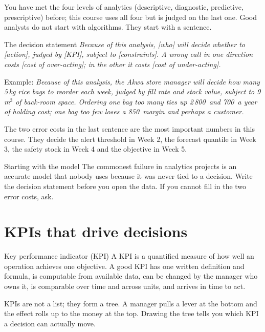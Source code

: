 You have met the four levels of analytics (descriptive, diagnostic, predictive, prescriptive) before; this course
uses all four but is judged on the last one. Good analysts do not start with algorithms. They start with a sentence.

\begin{keyformula}{The decision statement}
\emph{Because of this analysis, [who] will decide whether to [action], judged by [KPI], subject to [constraints].
A wrong call in one direction costs [cost of over-acting]; in the other it costs [cost of under-acting].}

\smallskip Example: \emph{Because of this analysis, the Akwa store manager will decide how many 5\,kg rice bags to
reorder each week, judged by fill rate and stock value, subject to 9\,m$^3$ of back-room space. Ordering one bag too
many ties up 2\,800\xaf\ and 700\xaf\ a year of holding cost; one bag too few loses a 850\xaf\ margin and perhaps a customer.}
\end{keyformula}

The two error costs in the last sentence are the most important numbers in this course. They decide the
alert threshold in Week 2, the forecast quantile in Week 3, the safety stock in Week 4 and the objective in Week 5.

\begin{pitfall}{Starting with the model}
The commonest failure in analytics projects is an accurate model that nobody uses because it was never tied to a
decision. Write the decision statement before you open the data. If you cannot fill in the two error costs, ask.
\end{pitfall}

\section{KPIs that drive decisions}
\begin{definition}{Key performance indicator (KPI)}
A KPI is a quantified measure of how well an operation achieves one objective. A good KPI has one written definition
and formula, is computable from available data, can be changed by the manager who owns it, is comparable over time
and across units, and arrives in time to act.
\end{definition}

KPIs are not a list; they form a tree. A manager pulls a lever at the bottom and the effect rolls up to the money
at the top. Drawing the tree tells you which KPI a decision can actually move.

